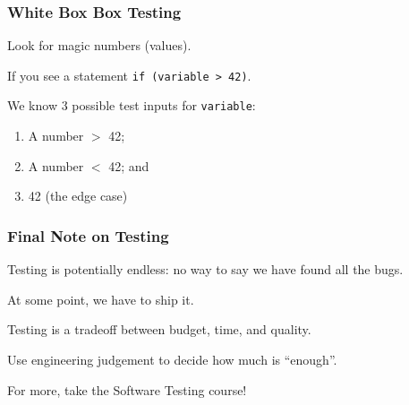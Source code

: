 \begin{frame}
\frametitle{White Box Box Testing}
\begin{changemargin}{1cm}

Look for magic numbers (values).

If you see a statement \texttt{if (variable > 42)}.

We know 3 possible test inputs for \texttt{variable}:
\begin{enumerate}
	\item A number $>$ 42;
    \item A number $<$ 42; and
    \item 42 (the edge case)
\end{enumerate}

\end{changemargin}
\end{frame}

\begin{frame}
\frametitle{Final Note on Testing}
\begin{changemargin}{1cm}

Testing is potentially endless: no way to say we have found all the bugs.

At some point, we have to ship it.

Testing is a tradeoff between budget, time, and quality.

Use engineering judgement to decide how much is ``enough''.

For more, take the Software Testing course!

\end{changemargin}
\end{frame}


